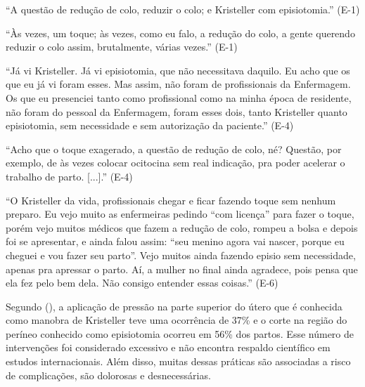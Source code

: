 \begin{citacao}
``A questão de redução de colo, reduzir o colo; e Kristeller com episiotomia.'' (E-1)
\end{citacao}

\begin{citacao}
``Às vezes, um toque; às vezes, como eu falo, a redução do colo, a gente querendo reduzir o colo assim, brutalmente, várias vezes.'' (E-1)
\end{citacao}

\begin{citacao}
``Já vi Kristeller. Já vi episiotomia, que não necessitava daquilo. Eu acho que os que eu já vi foram esses. Mas assim, não foram de profissionais da Enfermagem. Os que eu presenciei tanto como profissional como na minha época de residente, não foram do pessoal da Enfermagem, foram esses dois, tanto Kristeller quanto episiotomia, sem necessidade e sem autorização da paciente.'' (E-4)
\end{citacao}

\begin{citacao}
``Acho que o toque exagerado, a questão de redução de colo, né? Questão, por exemplo, de às vezes colocar ocitocina sem real indicação, pra poder acelerar o trabalho de parto. [...].'' (E-4)
\end{citacao}

\begin{citacao}
``O Kristeller da vida, profissionais chegar e ficar fazendo toque sem nenhum preparo. Eu vejo muito as enfermeiras pedindo ``com licença'' para fazer o toque, porém vejo muitos médicos que fazem a redução de colo, rompeu a bolsa e depois foi se apresentar, e ainda falou assim: ``seu menino agora vai nascer, porque eu cheguei e vou fazer seu parto''. Vejo muitos ainda fazendo episio sem necessidade, apenas pra apressar o parto. Aí, a mulher no final ainda agradece, pois pensa que ela fez pelo bem dela. Não consigo entender essas coisas.'' (E-6)
\end{citacao}

Segundo \citeauthor{zanardo2017violencia} (\citeyear{zanardo2017violencia}), a aplicação de pressão na parte superior do útero que é conhecida como manobra de Kristeller teve uma ocorrência de 37\% e o corte na região do períneo conhecido como episiotomia ocorreu em 56\% dos partos. Esse número de intervenções foi considerado excessivo e não encontra respaldo científico em estudos internacionais. Além disso, muitas dessas práticas são associadas a risco de complicações, são dolorosas e desnecessárias. 

